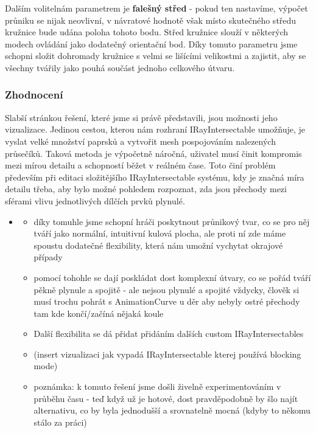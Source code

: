 Dalším volitelnám parametrem je \textbf{falešný střed} - pokud ten nastavíme, výpočet průniku se nijak neovlivní, v návratové hodnotě však místo skutečného středu kružnice bude udána poloha tohoto bodu. Střed kružnice slouží v některých modech ovládání jako dodatečný orientační bod. Díky tomuto parametru jsme schopni složit dohromady kružnice s velmi se lišícími velikostmi a zajistit, aby se všechny tvářily jako pouhá součást jednoho celkového útvaru. 

\subsubsection*{Zhodnocení}

Slabší stránkou řešení, které jsme si právě představili, jsou možnosti jeho vizualizace. Jedinou cestou, kterou nám rozhraní IRayIntersectable umožňuje, je vyslat velké množství paprsků a vytvořit mesh pospojováním nalezených průsečíků. Taková metoda je výpočetně náročná, uživatel musí činit kompromis mezi mírou detailu a schopností běžet v reálném čase. Toto činí problém především při editaci složitějšího IRayIntersectable systému, kdy je značná míra detailu třeba, aby bylo možné pohledem rozpoznat, zda jsou přechody mezi sférami vlivu jednotlivých dílčích prvků plynulé.



\begin{itemize}
    \item %
        \begin{itemize}
            \item díky tomuhle jsme schopní hráči poskytnout průnikový tvar, co se pro něj tváří jako normální, intuitivní kulová plocha, ale proti ní zde máme spoustu dodatečné flexibility, která nám umožní vychytat okrajové případy
            \item pomocí tohohle se dají poskládat dost komplexní útvary, co se pořád tváří pěkně plynule a spojitě - ale nejsou plynulé a spojité vždycky, člověk si musí trochu pohrát s AnimationCurve u děr aby nebyly ostré přechody tam kde končí/začíná nějaká koule
            \item Další flexibilita se dá přidat přidáním dalších custom IRayIntersectables
            \item (insert vizualizaci jak vypadá IRayIntersectable kterej používá blocking mode)
            \item poznámka: k tomuto řešení jsme došli živelně experimentováním v průběhu času - teď když už je hotové, dost pravděpodobně by šlo najít alternativu, co by byla jednodušší a srovnatelně mocná (kdyby to někomu stálo za práci)
        \end{itemize}
\end{itemize}

